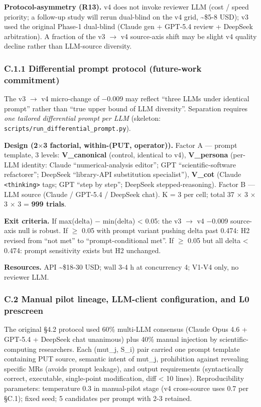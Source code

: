\documentclass[review,12pt,authoryear]{elsarticle}
\begin{document}
\textbf{Protocol-asymmetry (R13).} v4 does not invoke reviewer LLM (cost
/ speed priority; a follow-up study will rerun dual-blind on the v4
grid, \textasciitilde\$5-8 USD); v3 used the original Phase-1 dual-blind
(Claude gen + GPT-5.4 review + DeepSeek arbitration). A fraction of the
v3 $\to$ v4 source-axis shift may be slight v4 quality decline rather than
LLM-source diversity.

\subsubsection{C.1.1 Differential prompt protocol (future-work
commitment)}\label{c.1.1-differential-prompt-protocol-future-work-commitment}

The v3 $\to$ v4 micro-change of −0.009 may reflect ``three LLMs under
identical prompt'' rather than ``true upper bound of LLM diversity''.
Separation requires \emph{one tailored differential prompt per LLM}
(skeleton: \texttt{scripts/run\_differential\_prompt.py}).

\textbf{Design (2$\times$3 factorial, within-(PUT, operator)).} Factor A ---
prompt template, 3 levels: \textbf{V\_canonical} (control, identical to
v4), \textbf{V\_persona} (per-LLM identity: Claude ``numerical-analysis
editor''; GPT ``scientific-software refactorer''; DeepSeek ``library-API
substitution specialist''), \textbf{V\_cot} (Claude
\texttt{\textless{}thinking\textgreater{}} tags; GPT ``step by step'';
DeepSeek stepped-reasoning). Factor B --- LLM source (Claude / GPT-5.4 /
DeepSeek chat). K = 3 per cell; total 37 $\times$ 3 $\times$ 3 $\times$ 3 = \textbf{999
trials}.

\textbf{Exit criteria.} If max(delta) − min(delta) \textless{} 0.05: the
v3 $\to$ v4 −0.009 source-axis null is robust. If $\geq$ 0.05 with prompt variant
pushing delta past 0.474: H2 revised from ``not met'' to
``prompt-conditional met''. If $\geq$ 0.05 but all delta \textless{} 0.474:
prompt sensitivity exists but H2 unchanged.

\textbf{Resources.} API \textasciitilde\$18-30 USD; wall 3-4 h at
concurrency 4; V1-V4 only, no reviewer LLM.

\subsubsection{C.2 Manual pilot lineage, LLM-client configuration, and
L0
prescreen}\label{c.2-manual-pilot-lineage-llm-client-configuration-and-l0-prescreen}

The original §4.2 protocol used 60\% multi-LLM consensus (Claude Opus
4.6 + GPT-5.4 + DeepSeek chat unanimous) plus 40\% manual injection by
scientific-computing researchers. Each (mut\_j, S\_i) pair carried one
prompt template containing PUT source, semantic intent of mut\_j,
prohibition against revealing specific MRs (avoids prompt leakage), and
output requirements (syntactically correct, executable, single-point
modification, diff \textless{} 10 lines). Reproducibility parameters:
temperature 0.3 in manual-pilot stage (v4 cross-source uses 0.7 per
§C.1); fixed seed; 5 candidates per prompt with 2-3 retained.
\end{document}
